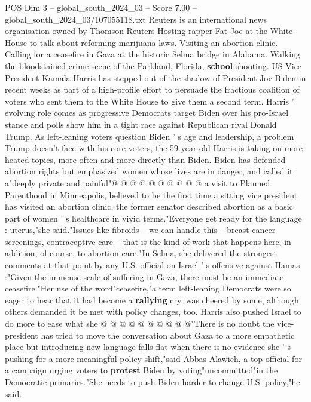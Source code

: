 \begin{textsample}{POS Dim 3 – global\_south\_2024\_03 – Score 7.00 – global\_south\_2024\_03/107055118.txt}  \label{ex:f3_pos_412}
Reuters is an international news organisation owned by Thomson Reuters Hosting rapper Fat Joe at the White House to talk about reforming marijuana laws.
Visiting an abortion clinic.
Calling for a ceasefire in Gaza at the historic Selma bridge in Alabama.
Walking the bloodstained crime scene of the Parkland, Florida, \textbf{school} shooting.
US Vice President Kamala Harris has stepped out of the shadow of President Joe Biden in recent weeks as part of a high-profile effort to persuade the fractious coalition of voters who sent them to the White House to give them a second term.
Harris ' evolving role comes as progressive Democrats target Biden over his pro-Israel stance and polls show him in a tight race against Republican rival Donald Trump.
As left-leaning voters question Biden ' s age and leadership, a problem Trump doesn't face with his core voters, the 59-year-old Harris is taking on more heated topics, more often and more directly than Biden.
Biden has defended abortion rights but emphasized women whose lives are in danger, and called it a"deeply private and painful"@ @ @ @ @ @ @ @ @ @ a visit to Planned Parenthood in Minneapolis, believed to be the first time a sitting vice president has visited an abortion clinic, the former senator described abortion as a basic part of women ' s healthcare in vivid terms."Everyone get ready for the language : uterus,"she said."Issues like fibroids -- we can handle this -- breast cancer screenings, contraceptive care -- that is the kind of work that happens here, in addition, of course, to abortion care."In Selma, she delivered the strongest comments at that point by any U.S. official on Israel ' s offensive against Hamas :"Given the immense scale of suffering in Gaza, there must be an immediate ceasefire."Her use of the word"ceasefire,"a term left-leaning Democrats were so eager to hear that it had become a \textbf{rallying} cry, was cheered by some, although others demanded it be met with policy changes, too.
Harris also pushed Israel to do more to ease what she @ @ @ @ @ @ @ @ @ @"There is no doubt the vice-president has tried to move the conversation about Gaza to a more empathetic place but introducing new language falls flat when there is no evidence she ' s pushing for a more meaningful policy shift,"said Abbas Alawieh, a top official for a campaign urging voters to \textbf{protest} Biden by voting"uncommitted"in the Democratic primaries."She needs to push Biden harder to change U.S. policy,"he said.

\end{textsample}
